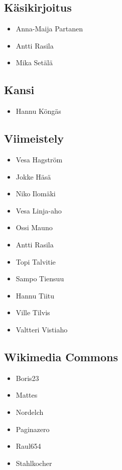 \subsection*{Käsikirjoitus}
\begin{itemize}
\item Anna-Maija Partanen
\item Antti Rasila
\item Mika Setälä
\end{itemize}

\subsection*{Kansi}
\begin{itemize}
\item Hannu Köngäs
\end{itemize}

\subsection*{Viimeistely}
\begin{itemize}
\item Vesa Hagström
\item Jokke Häsä
\item Niko Ilomäki
\item Vesa Linja-aho
\item Ossi Mauno
\item Antti Rasila
\item Topi Talvitie
\item Sampo Tiensuu
\item Hannu Tiitu
\item Ville Tilvis
\item Valtteri Vistiaho
\end{itemize}

\subsection*{Wikimedia Commons}
\begin{itemize}
\item Boris23
\item Mattes
\item Nordelch
\item Paginazero
\item Raul654
\item Stahlkocher
\end{itemize}
